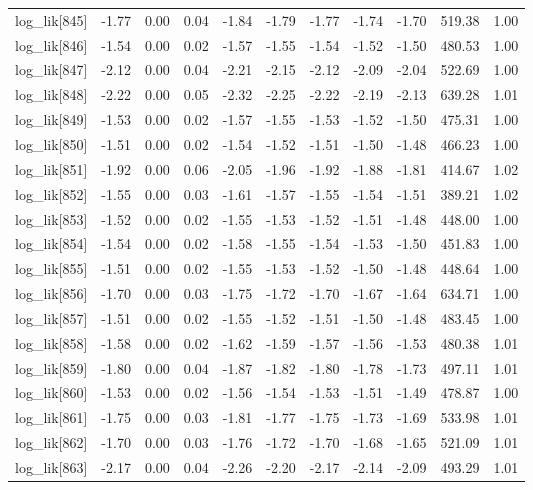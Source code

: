 \begin{table}[ht]
\begin{tabular}{rrrrrrrrrrr}
  log\_lik[845] & -1.77 & 0.00 & 0.04 & -1.84 & -1.79 & -1.77 & -1.74 & -1.70 & 519.38 & 1.00 \\ 
  log\_lik[846] & -1.54 & 0.00 & 0.02 & -1.57 & -1.55 & -1.54 & -1.52 & -1.50 & 480.53 & 1.00 \\ 
  log\_lik[847] & -2.12 & 0.00 & 0.04 & -2.21 & -2.15 & -2.12 & -2.09 & -2.04 & 522.69 & 1.00 \\ 
  log\_lik[848] & -2.22 & 0.00 & 0.05 & -2.32 & -2.25 & -2.22 & -2.19 & -2.13 & 639.28 & 1.01 \\ 
  log\_lik[849] & -1.53 & 0.00 & 0.02 & -1.57 & -1.55 & -1.53 & -1.52 & -1.50 & 475.31 & 1.00 \\ 
  log\_lik[850] & -1.51 & 0.00 & 0.02 & -1.54 & -1.52 & -1.51 & -1.50 & -1.48 & 466.23 & 1.00 \\ 
  log\_lik[851] & -1.92 & 0.00 & 0.06 & -2.05 & -1.96 & -1.92 & -1.88 & -1.81 & 414.67 & 1.02 \\ 
  log\_lik[852] & -1.55 & 0.00 & 0.03 & -1.61 & -1.57 & -1.55 & -1.54 & -1.51 & 389.21 & 1.02 \\ 
  log\_lik[853] & -1.52 & 0.00 & 0.02 & -1.55 & -1.53 & -1.52 & -1.51 & -1.48 & 448.00 & 1.00 \\ 
  log\_lik[854] & -1.54 & 0.00 & 0.02 & -1.58 & -1.55 & -1.54 & -1.53 & -1.50 & 451.83 & 1.00 \\ 
  log\_lik[855] & -1.51 & 0.00 & 0.02 & -1.55 & -1.53 & -1.52 & -1.50 & -1.48 & 448.64 & 1.00 \\ 
  log\_lik[856] & -1.70 & 0.00 & 0.03 & -1.75 & -1.72 & -1.70 & -1.67 & -1.64 & 634.71 & 1.00 \\ 
  log\_lik[857] & -1.51 & 0.00 & 0.02 & -1.55 & -1.52 & -1.51 & -1.50 & -1.48 & 483.45 & 1.00 \\ 
  log\_lik[858] & -1.58 & 0.00 & 0.02 & -1.62 & -1.59 & -1.57 & -1.56 & -1.53 & 480.38 & 1.01 \\ 
  log\_lik[859] & -1.80 & 0.00 & 0.04 & -1.87 & -1.82 & -1.80 & -1.78 & -1.73 & 497.11 & 1.01 \\ 
  log\_lik[860] & -1.53 & 0.00 & 0.02 & -1.56 & -1.54 & -1.53 & -1.51 & -1.49 & 478.87 & 1.00 \\ 
  log\_lik[861] & -1.75 & 0.00 & 0.03 & -1.81 & -1.77 & -1.75 & -1.73 & -1.69 & 533.98 & 1.01 \\ 
  log\_lik[862] & -1.70 & 0.00 & 0.03 & -1.76 & -1.72 & -1.70 & -1.68 & -1.65 & 521.09 & 1.01 \\ 
  log\_lik[863] & -2.17 & 0.00 & 0.04 & -2.26 & -2.20 & -2.17 & -2.14 & -2.09 & 493.29 & 1.01 \\ 

\end{tabular}
\end{table}
